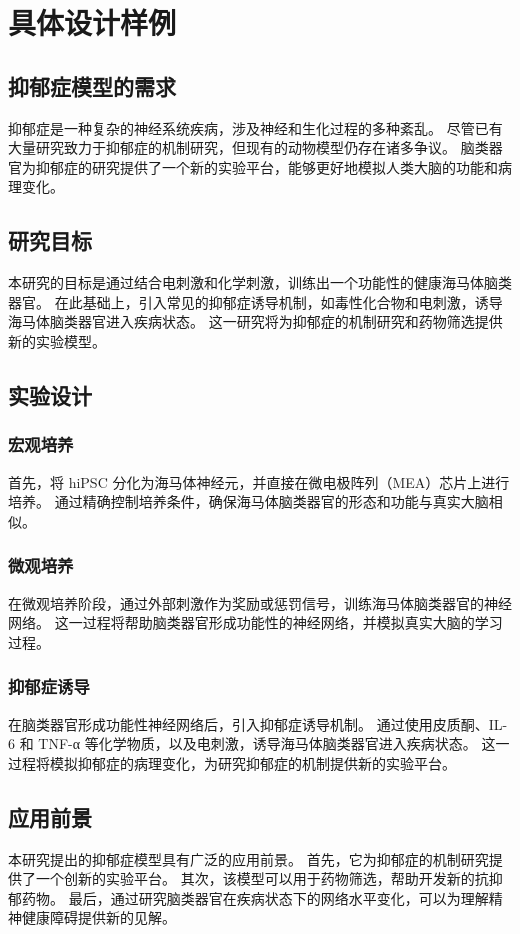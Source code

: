 \chapter{具体设计样例}\label{chap:design}

\section{抑郁症模型的需求}\label{sec:depression-model-requirement}
抑郁症是一种复杂的神经系统疾病，涉及神经和生化过程的多种紊乱。
尽管已有大量研究致力于抑郁症的机制研究，但现有的动物模型仍存在诸多争议。
脑类器官为抑郁症的研究提供了一个新的实验平台，能够更好地模拟人类大脑的功能和病理变化。


\section{研究目标}\label{sec:research-objective}
本研究的目标是通过结合电刺激和化学刺激，训练出一个功能性的健康海马体脑类器官。
在此基础上，引入常见的抑郁症诱导机制，如毒性化合物和电刺激，诱导海马体脑类器官进入疾病状态。
这一研究将为抑郁症的机制研究和药物筛选提供新的实验模型。


\section{实验设计}\label{sec:experiment-design}
\subsection{宏观培养}\label{subsec:macro-culture}
首先，将 hiPSC 分化为海马体神经元，并直接在微电极阵列（MEA）芯片上进行培养。
通过精确控制培养条件，确保海马体脑类器官的形态和功能与真实大脑相似。


\subsection{微观培养}\label{subsec:micro-culture}
在微观培养阶段，通过外部刺激作为奖励或惩罚信号，训练海马体脑类器官的神经网络。
这一过程将帮助脑类器官形成功能性的神经网络，并模拟真实大脑的学习过程。


\subsection{抑郁症诱导}\label{subsec:depression-induction}
在脑类器官形成功能性神经网络后，引入抑郁症诱导机制。
通过使用皮质酮、IL-6 和 TNF-α 等化学物质，以及电刺激，诱导海马体脑类器官进入疾病状态。
这一过程将模拟抑郁症的病理变化，为研究抑郁症的机制提供新的实验平台。


\section{应用前景}\label{sec:application-prospect}
本研究提出的抑郁症模型具有广泛的应用前景。
首先，它为抑郁症的机制研究提供了一个创新的实验平台。
其次，该模型可以用于药物筛选，帮助开发新的抗抑郁药物。
最后，通过研究脑类器官在疾病状态下的网络水平变化，可以为理解精神健康障碍提供新的见解。


